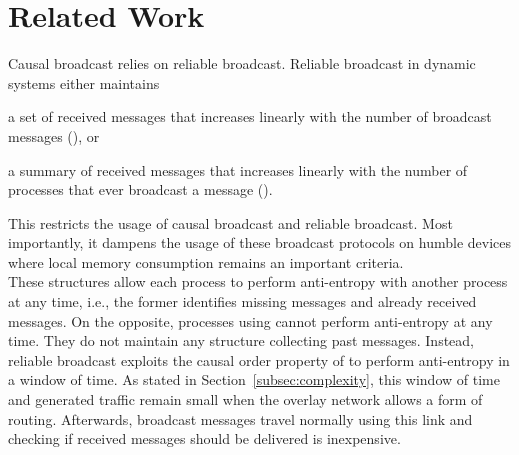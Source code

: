 
\section{Related Work}
\label{sec:relatedwork}




Causal broadcast relies on reliable broadcast. Reliable broadcast in dynamic
systems either maintains
\begin{inparaenum}[(i)]
\item a set of received messages that increases linearly with the number of
  broadcast messages (\REF), or
\item a summary of received messages that increases linearly with the number of
  processes that ever broadcast a message (\REF). 
\end{inparaenum}
This restricts the usage of causal broadcast and reliable broadcast. Most
importantly, it dampens the usage of these broadcast protocols on humble devices
where local memory consumption remains an important criteria. \\
These structures allow each process to perform anti-entropy with another process
at any time, i.e., the former identifies missing messages and already received
messages. On the opposite, processes using \RPCBROADCAST cannot perform
anti-entropy at any time. They do not maintain any structure collecting past
messages. Instead, reliable broadcast exploits the causal order property of
\RPCBROADCAST to perform anti-entropy in a window of time. As stated in
Section~\ref{subsec:complexity}, this window of time and generated traffic
remain small when the overlay network allows a form of routing. Afterwards,
broadcast messages travel normally using this link and checking if received
messages should be delivered is inexpensive.



